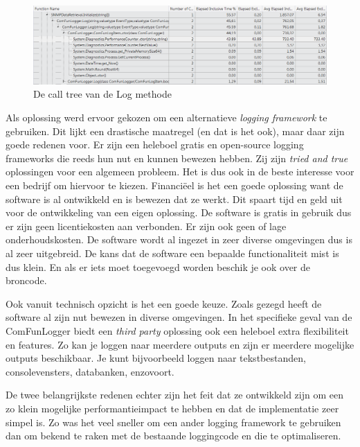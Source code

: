 \begin{figure}[h]
	\centering
	\includegraphics[scale=0.50]{figures/profiler/call-tree-performancecounter}
	\caption{De call tree van de Log methode}
	\label{call-tree-performancecounter}
\end{figure}


Als oplossing werd ervoor gekozen om een alternatieve \emph{logging framework} te gebruiken.
Dit lijkt een drastische maatregel (en dat is het ook), maar daar zijn goede redenen voor.
Er zijn een heleboel gratis en open-source logging frameworks die reeds hun nut en kunnen bewezen hebben.
Zij zijn \emph{tried and true} oplossingen voor een algemeen probleem. 
Het is dus ook in de beste interesse voor een bedrijf om hiervoor te kiezen. 
Financiëel is het een goede oplossing want de software is al ontwikkeld en is bewezen dat ze werkt.
Dit spaart tijd en geld uit voor de ontwikkeling van een eigen oplossing.
De software is gratis in gebruik dus er zijn geen licentiekosten aan verbonden.
Er zijn ook geen of lage onderhoudskosten. De software wordt al ingezet in zeer diverse omgevingen dus is al zeer uitgebreid.
De kans dat de software een bepaalde functionaliteit mist is dus klein.
En als er iets moet toegevoegd worden beschik je ook over de broncode.

Ook vanuit technisch opzicht is het een goede keuze.
Zoals gezegd heeft de software al zijn nut bewezen in diverse omgevingen.
In het specifieke geval van de ComFunLogger biedt een \emph{third party} oplossing ook een heleboel
extra flexibiliteit en features. Zo kan je loggen naar meerdere outputs en zijn er meerdere mogelijke outputs beschikbaar.
Je kunt bijvoorbeeld loggen naar tekstbestanden, consolevensters, databanken, enzovoort.

De twee belangrijkste redenen echter zijn het feit dat ze ontwikkeld zijn om een zo klein mogelijke performantieimpact te hebben en
dat de implementatie zeer simpel is.
Zo was het veel sneller om een ander logging framework te gebruiken dan om bekend te raken met de bestaande loggingcode en die te optimaliseren.

